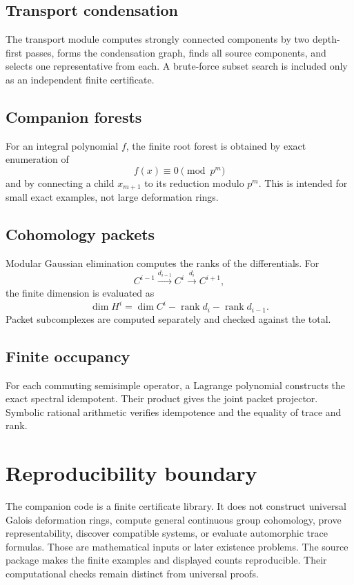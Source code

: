 \documentclass[11pt]{article}
\theoremstyle{definition}
\theoremstyle{remark}
\newcommand{\rank}{\operatorname{rank}}
\begin{document}
\subsection{Transport condensation}

The transport module computes strongly connected components by two depth-first passes, forms the condensation graph, finds all source components, and selects one representative from each.  A brute-force subset search is included only as an independent finite certificate.

\subsection{Companion forests}

For an integral polynomial \(f\), the finite root forest is obtained by exact enumeration of
\[
f(x)\equiv0\pmod{p^m}
\]
and by connecting a child \(x_{m+1}\) to its reduction modulo \(p^m\).  This is intended for small exact examples, not large deformation rings.

\subsection{Cohomology packets}

Modular Gaussian elimination computes the ranks of the differentials.  For
\[
C^{i-1}\xrightarrow{d_{i-1}}C^i\xrightarrow{d_i}C^{i+1},
\]
the finite dimension is evaluated as
\[
\dim H^i
=
\dim C^i-\rank d_i-\rank d_{i-1}.
\]
Packet subcomplexes are computed separately and checked against the total.

\subsection{Finite occupancy}

For each commuting semisimple operator, a Lagrange polynomial constructs the exact spectral idempotent.  Their product gives the joint packet projector.  Symbolic rational arithmetic verifies idempotence and the equality of trace and rank.

\section{Reproducibility boundary}

The companion code is a finite certificate library.  It does not construct universal Galois deformation rings, compute general continuous group cohomology, prove representability, discover compatible systems, or evaluate automorphic trace formulas.  Those are mathematical inputs or later existence problems.  The source package makes the finite examples and displayed counts reproducible. Their computational checks remain distinct from universal proofs.
\end{document}
